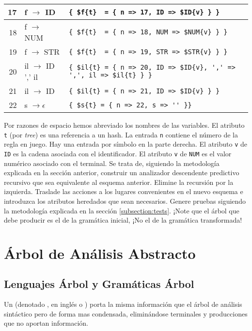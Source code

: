 \begin{small}
\begin{tabular}{|r|ll|}
17 & f $\rightarrow$  ID         & \verb|{ $f{t}  = { n => 17, ID => $ID{v} } }|\\
\hline
18 & f $\rightarrow$  NUM        & \verb|{ $f{t}  = { n => 18, NUM => $NUM{v} } }|\\
\hline
19 & f $\rightarrow$  STR        & \verb|{ $f{t}  = { n => 19, STR => $STR{v} } }|\\
\hline
20 & il $\rightarrow$ ID ',' il  & \verb|{ $il{t} = { n => 20, ID => $ID{v}, ',' => ',', il => $il{t} } }|\\ 
\hline
21 & il $\rightarrow$ ID         & \verb|{ $il{t} = { n => 21, ID => $ID{v} } }|\\
\hline
22 & s $\rightarrow \epsilon$    &  \verb|{ $s{t} = { n => 22, s => '' }}|\\
\hline
\end{tabular}
\end{small}
\vspace{0.25cm}

Por razones de espacio hemos abreviado los nombres de las variables.
El atributo \verb|t| (por \emph{tree}) es una referencia a un hash.
La entrada \verb|n| contiene el número de la regla en juego.
Hay una entrada por símbolo en la parte derecha. El atributo \verb|v| de 
\verb|ID| es la cadena asociada con el identificador. 
El atributo \verb|v| de \verb|NUM| es el valor numérico asociado con el terminal.
Se trata de, siguiendo la metodología explicada en la sección anterior,
construir un analizador descendente predictivo recursivo que sea equivalente
al esquema anterior. Elimine la recursión por la izquierda. Traslade las acciones a los
lugares convenientes en el nuevo esquema e introduzca los atributos heredados que sean necesarios.
Genere pruebas siguiendo la metodología 
explicada en la sección \ref{subsection:tests}. ¡Note que el árbol que debe producir 
es el de la gramática inicial, ¡No el de la gramática transformada!

\section{Árbol de Análisis Abstracto}
\label{section:aat}
\subsection{Lenguajes Árbol y Gramáticas Árbol}
\label{subsection:lenguajesarbol}
Un   (denotado , en
inglés  o ) 
porta la misma información que
el árbol de análisis sintáctico pero de forma mas condensada, eliminándose
terminales y producciones que no aportan información.

